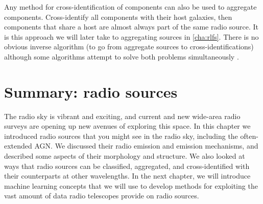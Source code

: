 \documentclass[11pt, a4paper]{book}
\providecommand{\DIFaddtex}[1]{{\protect\color{blue}\uwave{#1}}} %
\providecommand{\DIFaddbegin}{} %
\providecommand{\DIFaddend}{} %
\providecommand{\DIFadd}[1]{\texorpdfstring{\DIFaddtex{#1}}{#1}} %
\newcommand{\DIFaddincludegraphics}[2][]{{\color{blue}\fbox{\DIFOincludegraphics[#1]{#2}}}} %
\DeclareRobustCommand{\DIFaddbegin}{\DIFOaddbegin \let\includegraphics\DIFaddincludegraphics} %
\DeclareRobustCommand{\DIFaddend}{\DIFOaddend \let\includegraphics\DIFOincludegraphics} %
\begin{document}
        Any method for cross-identification of components can also be used to aggregate components. Cross-identify all components with their host galaxies, then components that share a host are almost always part of the same radio source. It is this approach \DIFaddbegin \DIFadd{that }\DIFaddend we will later take to aggregating sources in \autoref{cha:rlfs}. There is no obvious inverse algorithm (to go from aggregate sources to cross-identifications) although some algorithms attempt to solve both problems simultaneously \citep{fan_optimal_2020,fan15}.


\section{Summary: radio sources}
\label{sec:summary-radio}

    The radio sky is vibrant and exciting, and current and new wide-area radio surveys are opening up new avenues of exploring this space. In this chapter we introduced radio sources that you might see in the radio sky, including the often-extended AGN. We discussed their radio emission and emission mechanisms, and described some aspects of their morphology and structure. We also looked at ways that radio sources can be classified, aggregated, and cross-identified with their counterparts at other wavelengths. In the next chapter, we will introduce machine learning concepts that we will use to develop methods for exploiting the vast amount of data \DIFaddbegin \DIFadd{that }\DIFaddend radio telescopes provide on radio sources.
\end{document}
